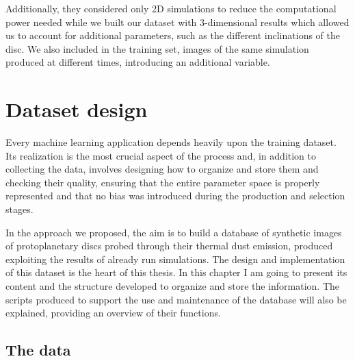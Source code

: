 \documentclass[a4paper,10pt]{report}
\begin{document}
Additionally, they considered only 2D simulations to reduce the computational power needed
while we built our dataset with 3-dimensional results which allowed us to account for additional parameters, such as the different 
inclinations of the disc. We also included in the training set, images of the same simulation
produced at different times, introducing an additional variable.

\chapter{Dataset design}

Every machine learning application depends heavily upon the training dataset. 
Its realization is the most crucial aspect of the process and, in addition to collecting the data,
involves designing how to organize and store them and checking their quality, 
ensuring that the entire parameter space is properly represented and that no bias was introduced during
the production and selection stages.

In the approach we proposed, the aim is to build a database of synthetic images of protoplanetary discs
probed through their thermal dust emission, produced exploiting 
the results of already run simulations. The design and implementation of this dataset is the heart of this
thesis. In this chapter I am going to present its content and the structure developed to organize and store the information. 
The scripts produced to support the use and maintenance of the database will also be explained, 
providing an overview of their functions.

\section{The data}

\end{document}
